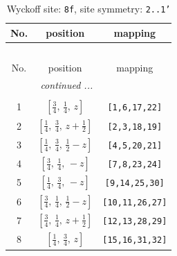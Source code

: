 \documentclass[fleqn,8pt]{jsarticle}
\begin{document}
\begin{longtable}{ccc}
\caption{Wyckoff site: {\tt 8f}, site symmetry: {\tt 2..1'}}
 \\
 \hline \hline
No. & position & mapping \\ \hline \endfirsthead

\multicolumn{2}{l}{\tablename\ \thetable{}} \\
 \hline \hline
No. & position & mapping \\ \hline \endhead

 \hline \hline
\multicolumn{2}{r}{\footnotesize\it continued ...} \\ \endfoot

 \hline \hline
\multicolumn{2}{r}{} \\ \endlastfoot

1 & $\left[ \frac{3}{4},\, \frac{1}{4},\, z \right]$ & {\tt [1,6,17,22]} \\ \hline
2 & $\left[ \frac{1}{4},\, \frac{3}{4},\, z + \frac{1}{2} \right]$ & {\tt [2,3,18,19]} \\ \hline
3 & $\left[ \frac{1}{4},\, \frac{3}{4},\, \frac{1}{2} - z \right]$ & {\tt [4,5,20,21]} \\ \hline
4 & $\left[ \frac{3}{4},\, \frac{1}{4},\, - z \right]$ & {\tt [7,8,23,24]} \\ \hline
5 & $\left[ \frac{1}{4},\, \frac{3}{4},\, - z \right]$ & {\tt [9,14,25,30]} \\ \hline
6 & $\left[ \frac{3}{4},\, \frac{1}{4},\, \frac{1}{2} - z \right]$ & {\tt [10,11,26,27]} \\ \hline
7 & $\left[ \frac{3}{4},\, \frac{1}{4},\, z + \frac{1}{2} \right]$ & {\tt [12,13,28,29]} \\ \hline
8 & $\left[ \frac{1}{4},\, \frac{3}{4},\, z \right]$ & {\tt [15,16,31,32]} \\
\end{longtable}
\renewcommand{\arraystretch}{1.2}
\end{document}
